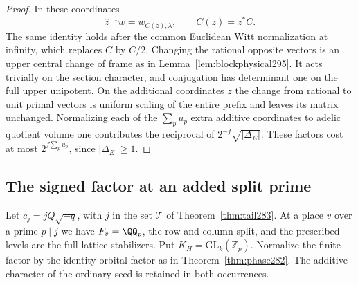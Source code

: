 \documentclass[a4paper,11pt]{article}
\theoremstyle{definition}
\theoremstyle{remark}
\newcommand{\ZZ}{\mathbb Z}\newcommand{\ord}{\operatorname{ord}}
\numberwithin{equation}{section}
\begin{document}
\begin{proof}
In these coordinates
\[
 \widehat z^{-1}w=w_{C(z),\lambda},\qquad C(z)=z^*C.
\]
The same identity holds after the common Euclidean Witt
normalization at infinity, which replaces \(C\) by \(C/2\).
Changing the rational opposite vectors is an upper central
change of frame as in Lemma~\ref{lem:blockphysical295}.
It acts trivially on the section character, and conjugation
has determinant one on the full upper unipotent. On the
additional coordinates \(z\) the change from rational
to unit primal vectors is uniform scaling of the entire
prefix and leaves its matrix unchanged. Normalizing each
of the \(\sum_pu_p\) extra additive coordinates to adelic
quotient volume one contributes the reciprocal of
\(2^{-f}\sqrt{|\Delta_E|}\). These factors cost at most
\(2^{f\sum_pu_p}\), since \(|\Delta_E|\ge1\).
\end{proof}

\subsection{The signed factor at an added split prime}\label{nav:VI-52}
Let \(c_j=jQ\sqrt{-q}\), with \(j\) in the set
\(\mathcal T\) of Theorem~\ref{thm:tail283}. At a place
\(v\) over a prime \(p\mid j\) we have \(F_v=\QQ_p\),
the row and column split, and the prescribed levels are the
full lattice stabilizers. Put \(K_H=\mathrm{GL}_k(\ZZ_p)\).
Normalize the finite factor by the identity orbital factor
as in Theorem~\ref{thm:phase282}. The additive character of
the ordinary seed is retained in both occurrences.
\end{document}
